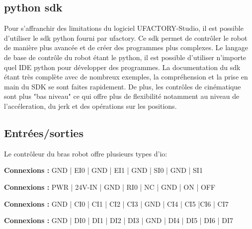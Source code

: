 \subsection{\gls{python} \gls{sdk}}
Pour s'affranchir des limitations du logiciel UFACTORY-Studio, il est possible d'utiliser le \gls{sdk} \gls{python} \cite{PythonSDK} fourni par \gls{ufactory}. Ce \gls{sdk} permet de contrôler le robot de manière plus avancée et de créer des programmes plus complexes. Le langage de base de contrôle du robot étant le \gls{python}, il est possible d'utiliser n'importe quel \gls{IDE} \gls{python} pour développer des programmes. La documentation du \gls{sdk} étant très complète avec de nombreux exemples, la compréhension et la prise en main du SDK se sont faites rapidement. De plus, les contrôles de cinématique sont plus "bas niveau" ce qui offre plus de flexibilité notamment au niveau de l'accéleration, du \gls{jerk} et des opérations sur les positions.

\subsection{Entrées/sorties}
Le contrôleur du bras robot offre plusieurs types d'\gls{io}:


\begin{tcolorbox}[colframe=black, colback=SafetyColor, title=Safety]
    \textbf{Connexions :} GND | EI0 | GND | EI1 | GND | SI0 | GND | SI1
\end{tcolorbox}

\begin{tcolorbox}[colframe=black, colback=PowerColor, title=Power]
    \textbf{Connexions :} PWR | 24V-IN | GND | RI0 | NC | GND | ON | OFF
\end{tcolorbox}

\begin{tcolorbox}[colframe=black, colback=ConfigInputColor, title=Configurable Inputs]
    \textbf{Connexions :} GND | CI0 | CI1 | CI2 | CI3 | GND | CI4 | CI5 |CI6 | CI7
\end{tcolorbox}

\begin{tcolorbox}[colframe=black, colback=DigitalInputColor, title=Digital Inputs]
    \textbf{Connexions :} GND |  DI0 | DI1 | DI2 | DI3 | GND | DI4 | DI5 | DI6 | DI7
\end{tcolorbox}

